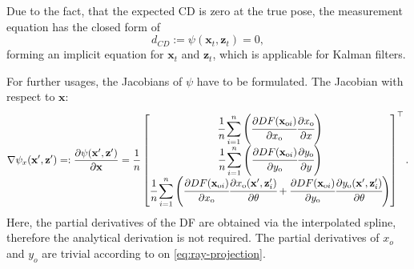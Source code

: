 Due to the fact, that the expected CD is zero at the true pose,
the measurement equation has the closed form of
\begin{equation}\label{eq:implicit-meas-eq}
    d_{CD} :=\psi(\mathbf{x}_t,\mathbf{z}_t) = 0,
\end{equation}
forming an implicit equation for $\mathbf{x}_t$ and $\mathbf{z}_t$, which is
applicable for Kalman filters.

For further usages, the Jacobians of $\psi$ have to be formulated.
The Jacobian with respect to $\mathbf{x}$:
\begin{equation}
    \nabla\psi_x(\mathbf{x}',\mathbf{z}') =: \frac{\partial\psi(\mathbf{x}',\mathbf{z}')}{\partial \mathbf{x}} =
    \frac{1}{n}
    \begin{bmatrix}
        \cfrac{1}{n}\displaystyle\sum\limits_{i=1}^{n}\left(\cfrac{\partial DF(\mathbf{x}_{\text{o}i})}{\partial x_{\text{o}}}\cfrac{\partial x_{\text{o}}}{\partial x}\right) \\
        \cfrac{1}{n}\displaystyle\sum\limits_{i=1}^{n}\left(\cfrac{\partial DF(\mathbf{x}_{\text{o}i})}{\partial y_{\text{o}}}\cfrac{\partial y_{\text{o}}}{\partial y}\right) \\
        \cfrac{1}{n}\displaystyle\sum\limits_{i=1}^{n}\left(\cfrac{\partial DF(\mathbf{x}_{\text{o}i})}{\partial x_{\text{o}}}\cfrac{\partial x_{\text{o}}(\mathbf{x}',\mathbf{z}'_i)}{\partial \theta}
        + \cfrac{\partial DF(\mathbf{x}_{\text{o}i})}{\partial y_{\text{o}}}\cfrac{\partial y_{\text{o}}(\mathbf{x}',\mathbf{z}'_i)}{\partial \theta}\right)                   \\
    \end{bmatrix}^{\top}.
\end{equation}
Here, the partial derivatives of the DF are obtained via the interpolated spline, therefore the analytical
derivation is not required.
The partial derivatives of $x_o$ and $y_o$ are trivial according to on \eqref{eq:ray-projection}.

